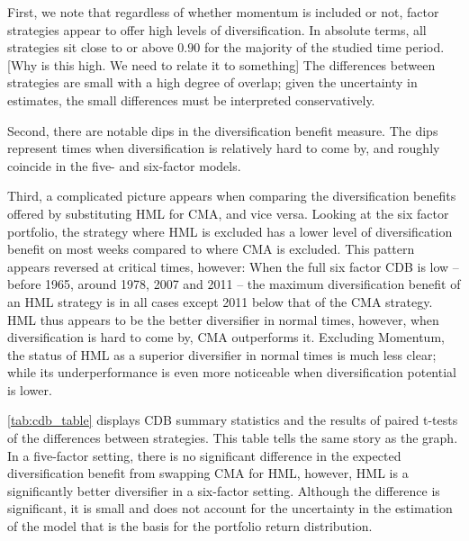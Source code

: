 First, we note that regardless of whether momentum is included or not, factor strategies appear to offer high levels of diversification. In absolute terms, all strategies sit close to or above $0.90$ for the majority of the studied time period. [Why is this high. We need to relate it to something] The differences between strategies are small with a high degree of overlap; given the uncertainty in estimates, the small differences must be interpreted conservatively.

Second, there are notable dips in the diversification benefit measure. The dips represent times when diversification is relatively hard to come by, and roughly coincide in the five- and six-factor models.

Third, a complicated picture appears when comparing the diversification benefits offered by substituting HML for CMA, and vice versa. Looking at the six factor portfolio, the strategy where HML is excluded has a lower level of diversification benefit on most weeks compared to where CMA is excluded. This pattern appears reversed at critical times, however: When the full six factor CDB is low -- before 1965, around 1978, 2007 and 2011 -- the maximum diversification benefit of an HML strategy is in all cases except 2011 below that of the CMA strategy. HML thus appears to be the better diversifier in normal times, however, when diversification is hard to come by, CMA outperforms it. Excluding Momentum, the status of HML as a superior diversifier in normal times is much less clear; while its underperformance is even more noticeable when diversification potential is lower.

\autoref{tab:cdb_table} displays CDB summary statistics and the results of paired t-tests of the differences between strategies. This table tells the same story as the graph. In a five-factor setting, there is no significant difference in the expected diversification benefit from swapping CMA for HML, however, HML is a significantly better diversifier in a six-factor setting. Although the difference is significant, it is small and does not account for the uncertainty in the estimation of the model that is the basis for the portfolio return distribution.





